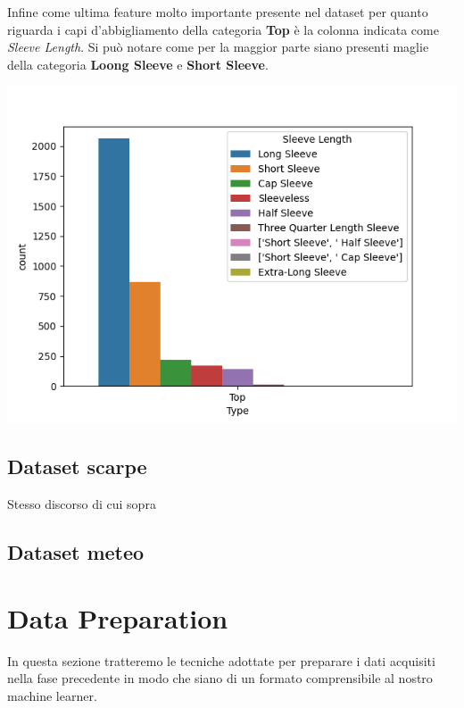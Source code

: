 \documentclass[a4paper, 11pt, oneside]{report}
\begin{document}
                \bigskip
                \par \noindent Infine come ultima feature molto importante presente nel dataset per quanto riguarda i capi
                d'abbigliamento della categoria \textbf{Top} è la colonna indicata come \textit{Sleeve Length}. Si può
                notare come per la maggior parte siano presenti maglie della categoria \textbf{Loong Sleeve} e
                \textbf{Short Sleeve}.
                \begin{center}
                    \includegraphics[scale=0.4]{countLengthTop}
                \end{center}
                \subsection{Dataset scarpe}
                Stesso discorso di cui sopra
                \subsection{Dataset meteo}

            \newpage
            \section{Data Preparation}
            In questa sezione tratteremo le tecniche adottate per preparare i dati acquisiti nella fase precedente in
            modo che siano di un formato comprensibile al nostro machine learner.
\end{document}
